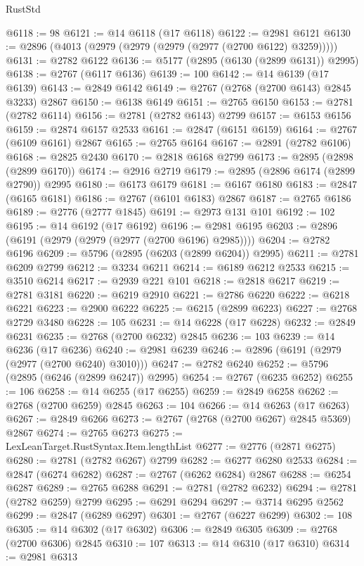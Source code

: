 \begin{lexlean}{RustStd}
\begin{coremodule}
@6118 := 98
@6121 := @14 @6118 (@17 @6118)
@6122 := @2981 @6121
@6130 := @2896 (@4013 (@2979 (@2979 (@2979 (@2977 (@2700 @6122) @3259)))))
@6131 := @2782 @6122
@6136 := @5177 (@2895 (@6130 (@2899 @6131)) @2995)
@6138 := @2767 (@6117 @6136)
@6139 := 100
@6142 := @14 @6139 (@17 @6139)
@6143 := @2849 @6142
@6149 := @2767 (@2768 (@2700 @6143) @2845 @3233) @2867
@6150 := @6138 @6149
@6151 := @2765 @6150
@6153 := @2781 (@2782 @6114)
@6156 := @2781 (@2782 @6143) @2799
@6157 := @6153 @6156
@6159 := @2874 @6157 @2533
@6161 := @2847 (@6151 @6159)
@6164 := @2767 (@6109 @6161) @2867
@6165 := @2765 @6164
@6167 := @2891 (@2782 @6106)
@6168 := @2825 @2430
@6170 := @2818 @6168 @2799
@6173 := @2895 (@2898 (@2899 @6170))
@6174 := @2916 @2719
@6179 := @2895 (@2896 @6174 (@2899 @2790)) @2995
@6180 := @6173 @6179
@6181 := @6167 @6180
@6183 := @2847 (@6165 @6181)
@6186 := @2767 (@6101 @6183) @2867
@6187 := @2765 @6186
@6189 := @2776 (@2777 @1845)
@6191 := @2973 @131 @101
@6192 := 102
@6195 := @14 @6192 (@17 @6192)
@6196 := @2981 @6195
@6203 := @2896 (@6191 (@2979 (@2979 (@2977 (@2700 @6196) @2985))))
@6204 := @2782 @6196
@6209 := @5796 (@2895 (@6203 (@2899 @6204)) @2995)
@6211 := @2781 @6209 @2799
@6212 := @3234 @6211
@6214 := @6189 @6212 @2533
@6215 := @3510 @6214
@6217 := @2939 @221 @101
@6218 := @2818 @6217
@6219 := @2781 @3181
@6220 := @6219 @2910
@6221 := @2786 @6220
@6222 := @6218 @6221
@6223 := @2900 @6222
@6225 := @6215 (@2899 @6223)
@6227 := @2768 @2729 @3480
@6228 := 105
@6231 := @14 @6228 (@17 @6228)
@6232 := @2849 @6231
@6235 := @2768 (@2700 @6232) @2845
@6236 := 103
@6239 := @14 @6236 (@17 @6236)
@6240 := @2981 @6239
@6246 := @2896 (@6191 (@2979 (@2977 (@2700 @6240) @3010)))
@6247 := @2782 @6240
@6252 := @5796 (@2895 (@6246 (@2899 @6247)) @2995)
@6254 := @2767 (@6235 @6252)
@6255 := 106
@6258 := @14 @6255 (@17 @6255)
@6259 := @2849 @6258
@6262 := @2768 (@2700 @6259) @2845
@6263 := 104
@6266 := @14 @6263 (@17 @6263)
@6267 := @2849 @6266
@6273 := @2767 (@2768 (@2700 @6267) @2845 @5369) @2867
@6274 := @2765 @6273
@6275 := LexLeanTarget.RustSyntax.Item.lengthList
@6277 := @2776 (@2871 @6275)
@6280 := @2781 (@2782 @6267) @2799
@6282 := @6277 @6280 @2533
@6284 := @2847 (@6274 @6282)
@6287 := @2767 (@6262 @6284) @2867
@6288 := @6254 @6287
@6289 := @2765 @6288
@6291 := @2781 (@2782 @6232)
@6294 := @2781 (@2782 @6259) @2799
@6295 := @6291 @6294
@6297 := @3714 @6295 @2562
@6299 := @2847 (@6289 @6297)
@6301 := @2767 (@6227 @6299)
@6302 := 108
@6305 := @14 @6302 (@17 @6302)
@6306 := @2849 @6305
@6309 := @2768 (@2700 @6306) @2845
@6310 := 107
@6313 := @14 @6310 (@17 @6310)
@6314 := @2981 @6313

\end{coremodule}
\end{lexlean}
